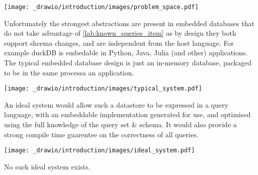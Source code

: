 \begin{center}
    \texttt{[image: \_drawio/introduction/images/problem\_space.pdf]}
\end{center}
Unfortunately the strongest abstractions are present in embedded databases that do not take advantage of \ref{lab:known_queries_item} as by design
they both support shcema changes, and are independent from the host language. For example duckDB is embedable in Python, Java, Julia (and other)
applications. The typical embedded database design is just an in-memory database, packaged to be in the same processa an application.
\begin{center}
    \texttt{[image: \_drawio/introduction/images/typical\_system.pdf]}
\end{center}
\noindent An ideal system would allow such a datastore to be expressed in a query language, with an embeddable
implementation generated for use, and optimised using the full knowledge of the query set \& schema. It would also provide a strong compile time guarentee on the correctness of all queries.
\begin{center}
    \texttt{[image: \_drawio/introduction/images/ideal\_system.pdf]}
\end{center}
\noindent
No such ideal system exists.

